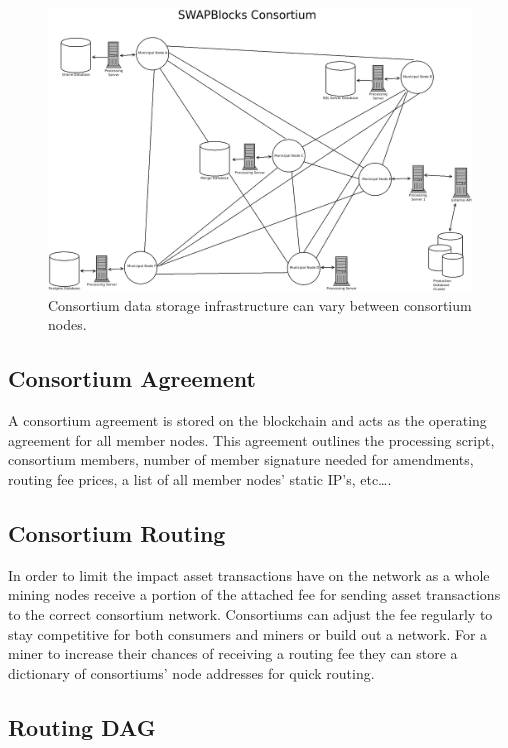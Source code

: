 \documentclass[12pt]{article}
\begin{document}
\begin{figure}[h]
	\centering
	\includegraphics[width=.85\textwidth]{consortium}
	\caption{Consortium data storage infrastructure can vary between consortium nodes.} 
	\label{fig:consortium}
\end{figure}


\subsection{Consortium Agreement}

A consortium agreement is stored 
on the blockchain and acts as the operating agreement for all member nodes. 
This agreement outlines the processing script, consortium 
members, number of member signature needed for amendments, routing fee prices, a 
list of all member nodes' static IP’s, etc….

\subsection{Consortium Routing}


In order to limit the impact asset transactions have on the network as a whole mining 
nodes receive a portion of the attached fee for sending asset transactions to the correct
consortium network.  Consortiums can adjust the fee regularly to stay competitive for both
consumers and miners or build out a network. 
For a miner to 
increase their chances of receiving a routing fee they can store a dictionary 
of consortiums' node addresses for quick routing.



\subsection{Routing DAG}
\end{document}
